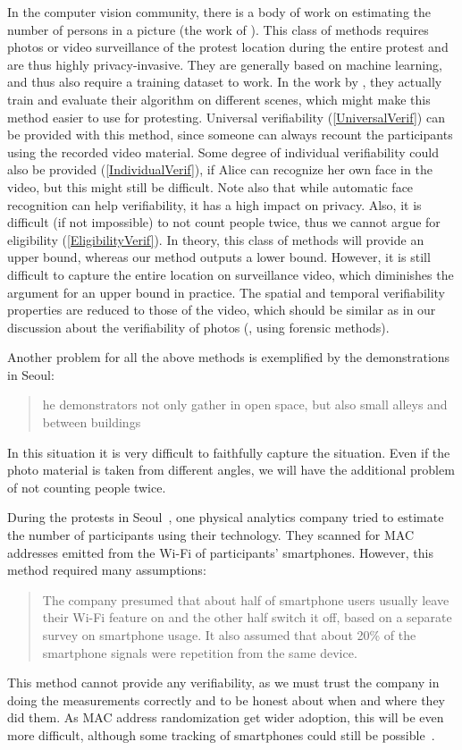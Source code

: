 In the computer vision community, there is a body of work on estimating the number of persons in a picture (\eg the work of 
\citet{NNCrowdCounting}).
This class of methods requires photos or video surveillance of the protest location during the entire protest and are thus highly privacy-invasive.
They are generally based on machine learning, and thus also require a training 
dataset to work.
In the work by \citet{NNCrowdCounting}, they actually train and evaluate their algorithm on different scenes, which might make this method easier to use for protesting.
Universal verifiability (\cref{UniversalVerif}) can be provided with this method, since someone can always recount the participants using the recorded video material.
Some degree of individual verifiability could also be provided (\cref{IndividualVerif}), if Alice can recognize her own face in the video, but this might still be difficult. 
Note also that while automatic face recognition can help verifiability, it has a high impact on privacy.
Also, it is difficult (if not impossible) to not count people twice, thus we cannot argue for eligibility (\cref{EligibilityVerif}).
In theory, this class of methods will provide an upper bound, whereas our method outputs a lower bound.
However, it is still difficult to capture the entire location on surveillance 
video, which diminishes the argument for an upper bound in practice.
The spatial and temporal verifiability properties are reduced to those of the video, which should be similar as in our discussion about the verifiability of photos (\ie, using forensic methods).

Another problem for all the above methods is exemplified by the demonstrations 
in Seoul:
\blockcquote{2016DemonstrationsInSeoul}{%
  he demonstrators not only gather in open space, but also small 
  alleys and between buildings%
}.
In this situation it is very difficult to faithfully capture the situation.
Even if the photo material is taken from different angles, we will have the additional problem of not counting people twice.

During the protests in Seoul~\cite{2016DemonstrationsInSeoul}, one physical 
analytics company tried to estimate the number of participants using their 
technology.
They scanned for MAC addresses emitted from the Wi-Fi of participants' smartphones.
However, this method required many assumptions:
\blockcquote{2016DemonstrationsInSeoul}{%
  The company presumed that about half of smartphone users usually leave their Wi-Fi feature on and the other half switch it off, based on a separate survey on smartphone usage. 
It also assumed that about 20\% of the smartphone signals were repetition from the same device.
}
This method cannot provide any verifiability, as we must trust the company in doing the measurements correctly and to be honest about when and where they did them.
As MAC address randomization get wider adoption, this will be even more difficult, although some tracking of smartphones could still be possible~\cite{WhyMACRandomizationIsNotEnough}.

